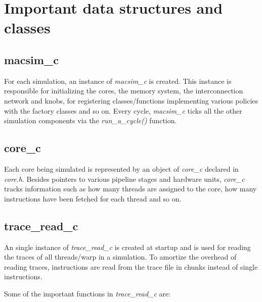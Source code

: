 \section{Important data structures and classes}


\subsection{macsim\_c}


For each simulation, an instance of \textit{macsim\_c} is created. This
instance is responsible for initializing the cores, the memory system, the
interconnection network and knobs, for registering classes/functions
implementing various policies with the factory classes and so on. Every cycle,
             \textit{macsim\_c} ticks all the other simulation components via
             the \textit{run\_a\_cycle()} function.


\subsection{core\_c}

Each core being simulated is represented by an object of \textit{core\_c}
declared in \textit{core.h}. Besides pointers to various pipeline stages and
hardware units, \textit{core\_c} tracks information such as how many threads
are assigned to the core, how many instructions have been fetched for each
thread and so on.


\subsection{trace\_read\_c}

An single instance of \textit{trace\_read\_c} is created at startup and is used
for reading the traces of all threads/warp in a simulation. To amortize the
overhead of reading traces, instructions are read from the trace file in chunks
instead of single instructions.

Some of the important functions in \textit{trace\_read\_c} are:

